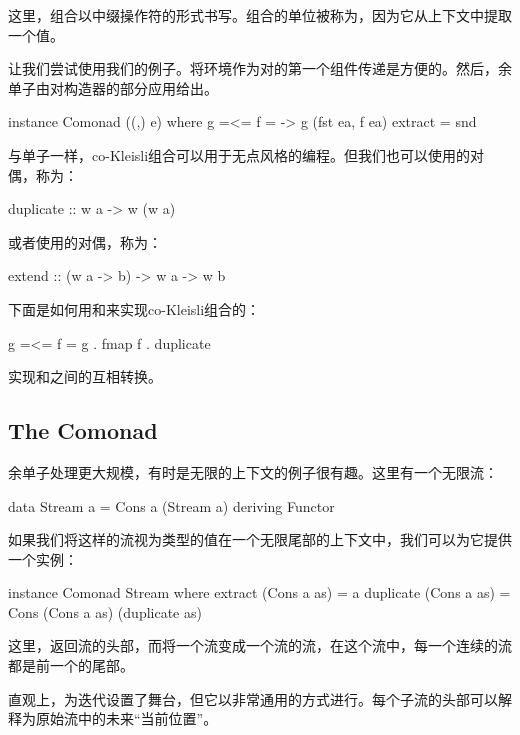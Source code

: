 \documentclass[DaoFP]{subfiles}
\begin{document}
    这里，组合以中缀操作符的形式书写。组合的单位被称为，因为它从上下文中提取一个值。

    让我们尝试使用我们的例子。将环境作为对的第一个组件传递是方便的。然后，余单子由对构造器的部分应用给出。
    \begin{haskell}
        instance Comonad ((,) e) where
        g =<= f = \ea -> g (fst ea, f ea)
        extract = snd
    \end{haskell}

    与单子一样，co-Kleisli组合可以用于无点风格的编程。但我们也可以使用的对偶，称为：
    \begin{haskell}
        duplicate :: w a -> w (w a)
    \end{haskell}
    或者使用的对偶，称为：
    \begin{haskell}
        extend :: (w a -> b) -> w a -> w b
    \end{haskell}
    下面是如何用和来实现co-Kleisli组合的：
    \begin{haskell}
        g =<= f = g . fmap f . duplicate
    \end{haskell}
    \begin{exercise}
        实现和之间的互相转换。
    \end{exercise}
    \subsection{The  Comonad}
    余单子处理更大规模，有时是无限的上下文的例子很有趣。这里有一个无限流：
    \begin{haskell}
        data Stream a = Cons a (Stream a)
        deriving Functor
    \end{haskell}

    如果我们将这样的流视为类型的值在一个无限尾部的上下文中，我们可以为它提供一个实例：
    \begin{haskell}
        instance Comonad Stream where
        extract (Cons a as) = a
        duplicate (Cons a as) = Cons (Cons a as) (duplicate as)
    \end{haskell}
    这里，返回流的头部，而将一个流变成一个流的流，在这个流中，每一个连续的流都是前一个的尾部。

    直观上，为迭代设置了舞台，但它以非常通用的方式进行。每个子流的头部可以解释为原始流中的未来“当前位置”。
\end{document}
